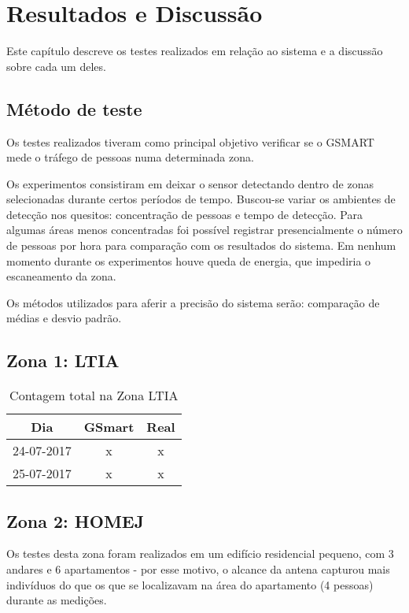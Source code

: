 \chapter{Resultados e Discussão}
\label{resultados-discussao}

Este capítulo descreve os testes realizados em relação ao sistema e a discussão sobre cada um deles.

\section{Método de teste}
\label{metodo-teste}
Os testes realizados tiveram como principal objetivo verificar se o GSMART mede o tráfego
de pessoas numa determinada zona.

Os experimentos consistiram em deixar o sensor detectando dentro de zonas
selecionadas durante certos períodos de tempo. Buscou-se variar os ambientes de
detecção nos quesitos: concentração de pessoas e tempo de detecção. Para algumas
áreas menos concentradas foi possível registrar presencialmente o número de
pessoas por hora para comparação com os resultados do sistema. Em nenhum momento durante os experimentos
houve queda de energia, que impediria o escaneamento da zona.

Os métodos utilizados para aferir a precisão do sistema serão: comparação de médias e desvio padrão.

\section{Zona 1: LTIA}
\label{ltia-zone}

\begin{table}[h]
\centering
\caption{Contagem total na Zona LTIA}
\vspace{0.5cm}
\begin{tabular}{c|cc}
Dia & GSmart & Real \\
\hline                                          
24-07-2017 & x & x \\
25-07-2017 & x & x 
\end{tabular}
\end{table}

\section{Zona 2: HOMEJ}
\label{homej-zone}

Os testes desta zona foram realizados em um edifício residencial pequeno, com 3 andares e 6 apartamentos - por esse motivo, o alcance da antena capturou mais indivíduos do que os que se localizavam na área do apartamento (4 pessoas) durante as medições. 

